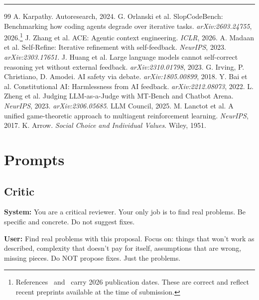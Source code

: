 \documentclass[10pt,twocolumn]{article}
\begin{document}
\vspace{4pt}
\hrule
\vspace{6pt}

\begin{thebibliography}{99}
\small
{} A. Karpathy. Autoresearch, 2024.
 G. Orlanski et al. SlopCodeBench: Benchmarking how coding agents degrade over iterative tasks. \textit{arXiv:2603.24755}, 2026.\footnote{References~\cite{slopcodebench} and~\cite{ace} carry 2026 publication dates. These are correct and reflect recent preprints available at the time of submission.}
 J. Zhang et al. ACE: Agentic context engineering. \textit{ICLR}, 2026.
 A. Madaan et al. Self-Refine: Iterative refinement with self-feedback. \textit{NeurIPS}, 2023. \textit{arXiv:2303.17651}.
 J. Huang et al. Large language models cannot self-correct reasoning yet without external feedback. \textit{arXiv:2310.01798}, 2023.
 G. Irving, P. Christiano, D. Amodei. AI safety via debate. \textit{arXiv:1805.00899}, 2018.
 Y. Bai et al. Constitutional AI: Harmlessness from AI feedback. \textit{arXiv:2212.08073}, 2022.
 L. Zheng et al. Judging LLM-as-a-Judge with MT-Bench and Chatbot Arena. \textit{NeurIPS}, 2023. \textit{arXiv:2306.05685}.
 LLM Council, 2025.
 M. Lanctot et al. A unified game-theoretic approach to multiagent reinforcement learning. \textit{NeurIPS}, 2017.
 K. Arrow. \textit{Social Choice and Individual Values}. Wiley, 1951.
\end{thebibliography}

\onecolumn
\appendix

\section{Prompts}
\label{app:prompts}

\subsection{Critic}
\begin{tcolorbox}[promptbox]
\textbf{System:} You are a critical reviewer. Your only job is to find real problems. Be specific and concrete. Do not suggest fixes.

\textbf{User:} Find real problems with this proposal. Focus on: things that won't work as described, complexity that doesn't pay for itself, assumptions that are wrong, missing pieces. Do NOT propose fixes. Just the problems.
\end{tcolorbox}
\end{document}
